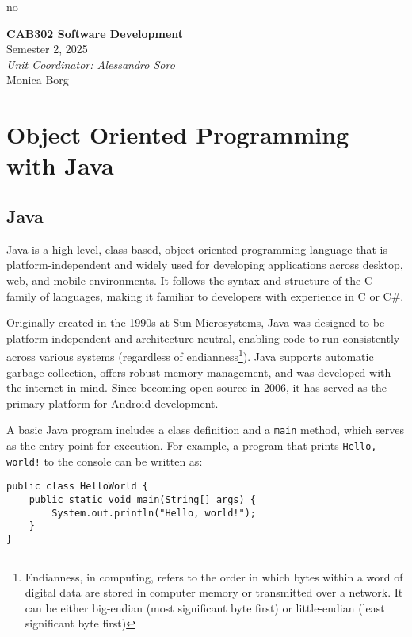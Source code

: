 no\documentclass{article}
\date{}
\newcommand{\unitName}{CAB302 Software Development}
\newcommand{\unitTime}{Semester 2, 2025}
\newcommand{\unitCoordinator}{Unit Coordinator: Alessandro Soro}
\newcommand{\documentAuthors}{Monica Borg}
\begin{document}
%
\begin{titlepage}
    \vspace*{\fill}
    \begin{center}
        \LARGE{\textbf{\unitName}} \\[0.1in]
        \normalsize{\unitTime} \\[0.2in]
        \normalsize\textit{\unitCoordinator} \\[0.2in]
        \documentAuthors
    \end{center}
    \vspace*{\fill}
    \thispagestyle{empty}
\end{titlepage}
\newpage
%
\tableofcontents
\newpage
%
\section{Object Oriented Programming with Java}

\subsection{Java}
Java is a high-level, class-based, object-oriented programming language that is platform-independent and widely used for developing applications across desktop, web, and mobile environments. It follows the syntax and structure of the C-family of languages, making it familiar to developers with experience in C or C\#.

Originally created in the 1990s at Sun Microsystems, Java was designed to be platform-independent and architecture-neutral, enabling code to run consistently across various systems (regardless of endianness\footnote{Endianness, in computing, refers to the order in which bytes within a word of digital data are stored in computer memory or transmitted over a network. It can be either big-endian (most significant byte first) or little-endian (least significant byte first)}). Java supports automatic garbage collection, offers robust memory management, and was developed with the internet in mind. Since becoming open source in 2006, it has served as the primary platform for Android development.

A basic Java program includes a class definition and a \texttt{main} method, which serves as the entry point for execution. For example, a program that prints \texttt{Hello, world!} to the console can be written as:

\begin{verbatim}
public class HelloWorld {
    public static void main(String[] args) {
        System.out.println("Hello, world!");
    }
}
\end{verbatim}
\end{document}
